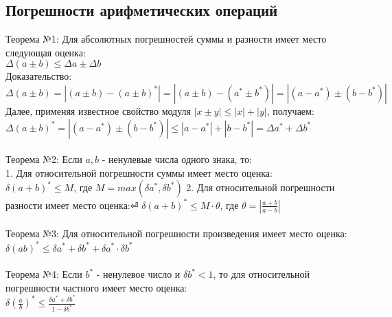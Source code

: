 \documentclass[a4paper]{article}
\begin{document}
\subsection{Погрешности арифметических операций}
\setcounter{subsection}{6}
Теорема №1: Для абсолютных погрешностей суммы и разности имеет место следующая оценка:\\
$ \Delta (a \pm b)  \leq \Delta a \pm \Delta b   $\\
Доказательство:\\
$ \Delta (a \pm b) = |(a \pm b) - (a \pm b)^{*}| = |(a \pm b) - (a^* \pm b^*)| = |(a-a^*)\pm(b-b^*)|$\\
Далее, применяя известное свойство модуля $ |x\pm y| \leq |x| + |y| $, получаем:\\
$ \Delta (a\pm b)^* = | (a-a^*)\pm(b-b^*)| \leq |a-a^*| + |b-b^*| = \Delta a^* + \Delta b^* $\\\\
Теорема №2: Если $ a,b $ - ненулевые числа одного знака, то:\\
1. Для относительной погрешности суммы имеет место оценка:\\
$ \delta(a+b)^* \leq M $, где $ M = max(\delta a^*, \delta b^*)$ 
2. Для относительной погрешности разности имеет место оценка:⏎
$ \delta(a+b)^* \leq M \cdot \theta$, где $ \theta = |\frac{a+b}{a-b}|$\\\\
Теорема №3: Для относительной погрешности произведения имеет место оценка: \\
$ \delta (ab)^* \leq \delta a^* + \delta b^* + \delta a^* \cdot \delta b^* $\\\\
Теорема №4: Если $ b^* $ - ненулевое число и $ \delta b^* < 1 $, то для относительной погрешности частного имеет место оценка:\\
$ \delta (\frac{a}{b})^* \leq \frac{\delta a^* + \delta b^*}{1 - \delta b^*} $
\end{document}
